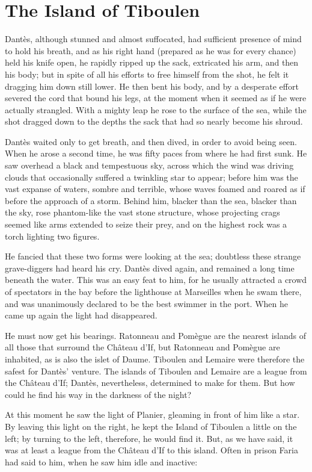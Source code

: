 \chapter{The Island of Tiboulen}

Dantès, although stunned and almost suffocated, had sufficient presence
of mind to hold his breath, and as his right hand (prepared as he was
for every chance) held his knife open, he rapidly ripped up the sack,
extricated his arm, and then his body; but in spite of all his efforts
to free himself from the shot, he felt it dragging him down still
lower. He then bent his body, and by a desperate effort severed the
cord that bound his legs, at the moment when it seemed as if he were
actually strangled. With a mighty leap he rose to the surface of the
sea, while the shot dragged down to the depths the sack that had so
nearly become his shroud.

Dantès waited only to get breath, and then dived, in order to avoid
being seen. When he arose a second time, he was fifty paces from where
he had first sunk. He saw overhead a black and tempestuous sky, across
which the wind was driving clouds that occasionally suffered a
twinkling star to appear; before him was the vast expanse of waters,
sombre and terrible, whose waves foamed and roared as if before the
approach of a storm. Behind him, blacker than the sea, blacker than the
sky, rose phantom-like the vast stone structure, whose projecting crags
seemed like arms extended to seize their prey, and on the highest rock
was a torch lighting two figures.

He fancied that these two forms were looking at the sea; doubtless
these strange grave-diggers had heard his cry. Dantès dived again, and
remained a long time beneath the water. This was an easy feat to him,
for he usually attracted a crowd of spectators in the bay before the
lighthouse at Marseilles when he swam there, and was unanimously
declared to be the best swimmer in the port. When he came up again the
light had disappeared.

He must now get his bearings. Ratonneau and Pomègue are the nearest
islands of all those that surround the Château d’If, but Ratonneau and
Pomègue are inhabited, as is also the islet of Daume. Tiboulen and
Lemaire were therefore the safest for Dantès’ venture. The islands of
Tiboulen and Lemaire are a league from the Château d’If; Dantès,
nevertheless, determined to make for them. But how could he find his
way in the darkness of the night?

At this moment he saw the light of Planier, gleaming in front of him
like a star. By leaving this light on the right, he kept the Island of
Tiboulen a little on the left; by turning to the left, therefore, he
would find it. But, as we have said, it was at least a league from the
Château d’If to this island. Often in prison Faria had said to him,
when he saw him idle and inactive:

